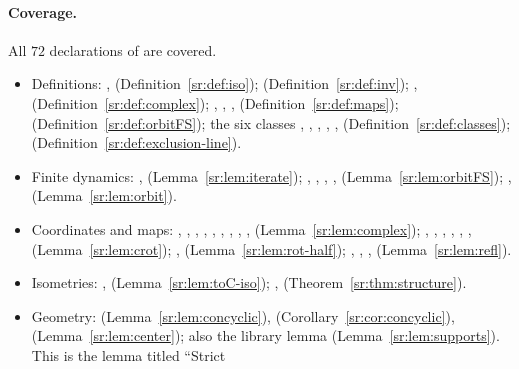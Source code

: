 \paragraph{Coverage.}
All $72$ declarations of  are covered.
\begin{itemize}
\item Definitions: ,  (Definition~\ref{sr:def:iso}); 
  (Definition~\ref{sr:def:inv}); ,  (Definition~\ref{sr:def:complex}); , ,
  ,  (Definition~\ref{sr:def:maps});  (Definition~\ref{sr:def:orbitFS}); the
  six classes , , , , ,
   (Definition~\ref{sr:def:classes}); 
  (Definition~\ref{sr:def:exclusion-line}).
\item Finite dynamics: ,  (Lemma~\ref{sr:lem:iterate});
  , , , ,
   (Lemma~\ref{sr:lem:orbitFS}); ,
   (Lemma~\ref{sr:lem:orbit}).
\item Coordinates and maps: , , , , ,
  , , , , 
  (Lemma~\ref{sr:lem:complex}); , , , ,
  , ,  (Lemma~\ref{sr:lem:crot});
  ,  (Lemma~\ref{sr:lem:rot-half}); ,
  , , 
  (Lemma~\ref{sr:lem:refl}).
\item Isometries: ,  (Lemma~\ref{sr:lem:toC-iso});
  ,  (Theorem~\ref{sr:thm:structure}).
\item Geometry:  (Lemma~\ref{sr:lem:concyclic}), 
  (Corollary~\ref{sr:cor:concyclic}),  (Lemma~\ref{sr:lem:center}); also the library
  lemma  (Lemma~\ref{sr:lem:supports}). This is the lemma titled ``Strict

\end{itemize}
